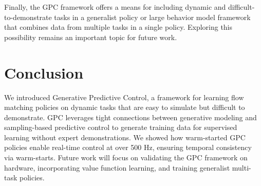\documentclass[letterpaper, 10 pt]{ieeeconf}
\begin{document}
Finally, the GPC framework offers a means for including dynamic and difficult-to-demonstrate tasks in a generalist policy \cite{black2024pi_0} or large behavior model \cite{lbm} framework that combines data from multiple tasks in a single policy. Exploring this possibility remains an important topic for future work.

\section{Conclusion}

We introduced Generative Predictive Control, a framework for learning flow matching policies on dynamic tasks that are easy to simulate but difficult to demonstrate. GPC leverages tight connections between generative modeling and sampling-based predictive control to generate training data for supervised learning without expert demonstrations. We showed how warm-started GPC policies enable real-time control at over 500 Hz, ensuring temporal consistency via warm-starts. Future work will focus on validating the GPC framework on hardware, incorporating value function learning, and training generalist multi-task policies.



\end{document}
